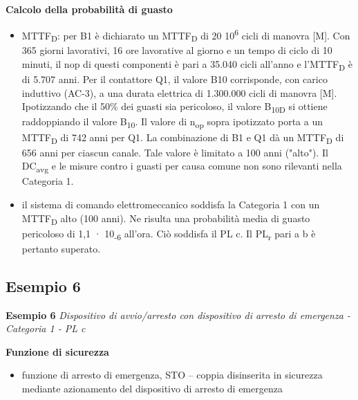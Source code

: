 \textbf{Calcolo della probabilità di guasto}
\begin{itemize}
    \item MTTF\textsubscript{D}: per B1 è dichiarato un MTTF\textsubscript{D} di 20 10\textsuperscript{6} cicli di manovra [M]. Con 365 giorni lavorativi, 16 ore lavorative al giorno e un tempo di ciclo di 10 minuti, il nop di questi componenti è pari a 35.040 cicli all'anno e l'MTTF\textsubscript{D} è di 5.707 anni. Per il contattore Q1, il valore B10 corrisponde, con carico induttivo (AC-3), a una durata elettrica di 1.300.000 cicli di manovra [M]. Ipotizzando che il 50\% dei guasti sia pericoloso, il valore B\textsubscript{10D} si ottiene raddoppiando il valore B\textsubscript{10}. Il valore di n\textsubscript{op} sopra ipotizzato porta a un MTTF\textsubscript{D} di 742 anni per Q1. La combinazione di B1 e Q1 dà un MTTF\textsubscript{D} di 656 anni per ciascun canale. Tale valore è limitato a 100 anni ("alto").
    Il DC\textsubscript{avg} e le misure contro i guasti per causa comune non sono rilevanti nella Categoria 1.
    \item il sistema di comando elettromeccanico soddisfa la Categoria 1 con un MTTF\textsubscript{D} alto (100 anni). Ne risulta una probabilità media di guasto pericoloso di 1,1 · 10\textsubscript{-6} all'ora. Ciò soddisfa il PL c. Il PL\textsubscript{r} pari a b è pertanto superato.
\end{itemize}
\clearpage

\subsection{Esempio 6}
\label{sec:08-2-6}
\textbf{Esempio 6}
\textit{Dispositivo di avvio/arresto con dispositivo di arresto di emergenza - Categoria 1 - PL c}

\begin{center}
    \begin{minipage}{\textwidth}
        \centering
        \captionsetup{hypcap=false}
        \resizebox{0.6\textwidth}{!}{}
        \label{fig:08-13}
    \end{minipage}
\end{center}

\textbf{Funzione di sicurezza}
\begin{itemize}
    \item funzione di arresto di emergenza, STO – coppia disinserita in sicurezza mediante azionamento del dispositivo di arresto di emergenza
\end{itemize}

